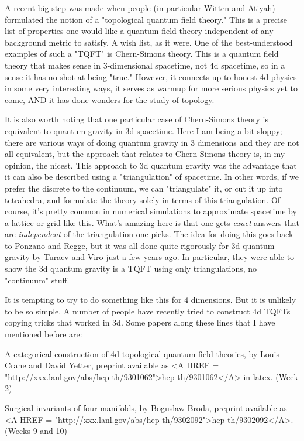 A recent big step was made when people (in particular Witten and Atiyah)
formulated the notion of a "topological quantum field theory."  This is
a precise list of properties one would like a quantum field theory
independent of any background metric to satisfy.  A wish list, as it
were.  One of the best-understood examples of such a "TQFT" is
Chern-Simons theory.  This is a quantum field theory that makes sense in
3-dimensional spacetime, not 4d spacetime, so in a sense it has no shot
at being "true."  However, it connects up to honest 4d physics in some
very interesting ways, it serves as warmup for more serious physics yet
to come, AND it has done wonders for the study of topology.  

It is also worth noting that one particular case of Chern-Simons theory is
equivalent to quantum gravity in 3d spacetime.  Here I am being a bit
sloppy; there are various ways of doing quantum gravity in 3 dimensions
and they are not all equivalent, but the approach that relates to Chern-Simons
theory is, in my opinion, the nicest.  This approach to 3d quantum
gravity was the advantage that it can also be described using a
"triangulation" of spacetime.   In other words, if we prefer the
discrete to the continuum, we can "triangulate" it, or cut
it up into tetrahedra, and formulate the theory solely in terms of this
triangulation.  Of course, it's pretty common in numerical simulations
to approximate spacetime by a lattice or grid like this.  What's amazing
here is that one gets \emph{exact} answers that are \emph{independent} of the
triangulation one picks.  The idea for doing this goes back to Ponzano
and Regge, but it was all done quite rigorously for 3d quantum gravity
by Turaev and Viro just a few years ago.  In particular, they were able
to show the 3d quantum gravity is a TQFT using only triangulations, no
"continuum" stuff.

It is tempting to try to do something like this for 4 dimensions.  But
it is unlikely to be so simple.  A number of people have recently tried
to construct 4d TQFTs copying tricks that worked in 3d.  Some papers
along these lines that I have mentioned before are:

A categorical construction of 4d topological quantum field theories,
by Louis Crane and David Yetter, preprint available as <A HREF = "http://xxx.lanl.gov/abs/hep-th/9301062">hep-th/9301062</A> in 
latex.   (Week 2)

Surgical invariants of four-manifolds, by Boguslaw Broda, preprint
available as <A HREF = "http://xxx.lanl.gov/abs/hep-th/9302092">hep-th/9302092</A>.   (Weeks 9 and 10)

